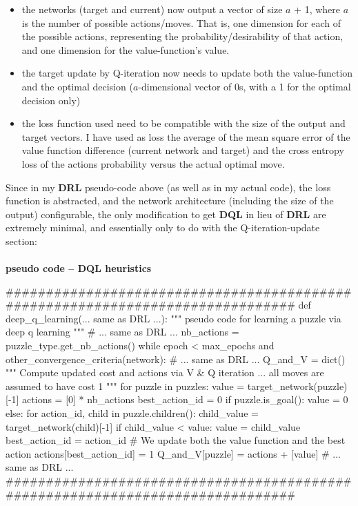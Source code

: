\begin{itemize}
\item the networks (target and current) now output a vector of size $a$ + 1, where $a$ is the number of possible actions/moves. That is, one dimension for each of the possible actions, representing the probability/desirability of that action, and one dimension for the value-function's value.
\item the target update by Q-iteration now needs to update both the value-function and the optimal decision ($a$-dimensional vector of 0s, with a 1 for the optimal decision only)
\item the loss function used need to be compatible with the size of the output and target vectors. I have used as loss the average of the mean square error of the value function difference (current network and target) and the cross entropy loss of the actions probability versus the actual optimal move.
\end{itemize}
Since in my \textbf{DRL} pseudo-code above (as well as in my actual code), the loss function is abstracted, and the network architecture (including the size of the output) configurable, the only modification to get \textbf{DQL} in lieu of \textbf{DRL} are extremely minimal, and essentially only to do with the Q-iteration-update section:


\teal
\paragraph{}{\textbf{pseudo code -- \textbf{DQL} heuristics}}
\begin{pseudocode}
###############################################################################
def deep_q_learning(... same as DRL ...):
    """ pseudo code for learning a puzzle via deep q learning """
    # ... same as DRL ...
    nb_actions = puzzle_type.get_nb_actions()
    while epoch < max_epochs and other_convergence_criteria(network):
        # ... same as DRL ...
        Q_and_V = dict()
        """ Compute updated cost and actions via V & Q iteration ... 
             all moves are assumed to have cost 1 """
        for puzzle in puzzles:
            value = target_network(puzzle)[-1]
            actions = [0] * nb_actions
            best_action_id = 0
            if puzzle.is_goal():
                value = 0
            else:
                for action_id, child in puzzle.children():
                    child_value = target_network(child)[-1]
                    if child_value < value:
                        value = child_value
                        best_action_id = action_id
            # We update both the value function and the best action
            actions[best_action_id] = 1
            Q_and_V[puzzle] = actions + [value]
        # ... same as DRL ...
###############################################################################
\end{pseudocode}
\black


